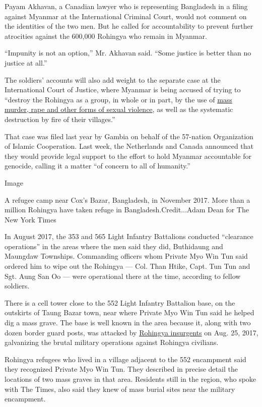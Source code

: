 Payam Akhavan, a Canadian lawyer who is representing Bangladesh in a
filing against Myanmar at the International Criminal Court, would not
comment on the identities of the two men. But he called for
accountability to prevent further atrocities against the 600,000
Rohingya who remain in Myanmar.

``Impunity is not an option,'' Mr. Akhavan said. ``Some justice is
better than no justice at all.''

The soldiers' accounts will also add weight to the separate case at the
International Court of Justice, where Myanmar is being accused of trying
to ``destroy the Rohingya as a group, in whole or in part, by the use of
\href{https://www.nytimes3xbfgragh.onion/2017/09/02/world/asia/rohingya-myanmar-bangladesh-refugees-massacre.html?action=click\&module=RelatedCoverage\&pgtype=Article\&region=Footer}{mass
murder, rape and other forms of sexual violence}, as well as the
systematic destruction by fire of their villages.''

That case was filed last year by Gambia on behalf of the 57-nation
Organization of Islamic Cooperation. Last week, the Netherlands and
Canada announced that they would provide legal support to the effort to
hold Myanmar accountable for genocide, calling it a matter ``of concern
to all of humanity.''

Image

A refugee camp near Cox's Bazar, Bangladesh, in November 2017. More than
a million Rohingya have taken refuge in Bangladesh.Credit...Adam Dean
for The New York Times

In August 2017, the 353 and 565 Light Infantry Battalions conducted
``clearance operations'' in the areas where the men said they did,
Buthidaung and Maungdaw Townships. Commanding officers whom Private Myo
Win Tun said ordered him to wipe out the Rohingya --- Col. Than Htike,
Capt. Tun Tun and Sgt. Aung San Oo --- were operational there at the
time, according to fellow soldiers.

There is a cell tower close to the 552 Light Infantry Battalion base, on
the outskirts of Taung Bazar town, near where Private Myo Win Tun said
he helped dig a mass grave. The base is well known in the area because
it, along with two dozen border guard posts, was attacked by
\href{https://www.nytimes3xbfgragh.onion/2017/09/17/world/asia/myanmar-rohingya-militants.html?module=inline}{Rohingya
insurgents} on Aug. 25, 2017, galvanizing the brutal military operations
against Rohingya civilians.

Rohingya refugees who lived in a village adjacent to the 552 encampment
said they recognized Private Myo Win Tun. They described in precise
detail the locations of two mass graves in that area. Residents still in
the region, who spoke with The Times, also said they knew of mass burial
sites near the military encampment.

